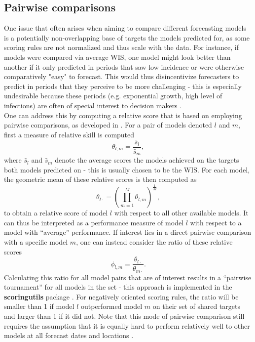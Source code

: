 \subsection{Pairwise comparisons}
One issue that often arises when aiming to compare different forecasting models is a potentially non-overlapping base of targets the models predicted for, as some scoring rules are not normalized and thus scale with the data. For instance, if models were compared via average WIS, one model might look better than another if it only predicted in periods that saw low incidence or were otherwise comparatively "easy" to forecast. This would thus disincentivize forecasters to predict in periods that they perceive to be more challenging - this is especially undesirable because these periods (e.g. exponential growth, high level of infections) are often of special interest to decision makers .\\
One can address this by computing a relative score that is based on employing pairwise comparisons, as developed in \cite{cramer_evaluation_2022}. For a pair of models denoted $l$ and $m$, first a measure of relative skill is computed
\[
\theta_{l,m} = \frac{\bar{s}_{l}}{\bar{s}_{m}},
\]
where $\bar{s}_{l}$ and $\bar{s}_{m}$ denote the average scores the models achieved on the targets both models predicted on - this is usually chosen to be the WIS. For each model, the geometric mean of these relative scores is then computed as
\[
\theta_{l\cdot} = \left(\prod_{m = 1}^{M}\theta_{l,m} \right)^{\frac{1}{M}},
\]to obtain a relative score of model $l$ with respect to all other available models. It can thus be interpreted as a performance measure of model $l$ with respect to a model with ``average'' performance. If interest lies in a direct pairwise comparison with a specific model $m$, one can instead consider the ratio of these relative scores
\[
\phi_{l,m} = \frac{\theta_{l\cdot}}{\theta_{m\cdot}}.
\]
Calculating this ratio for all model pairs that are of interest results in a ``pairwise tournament'' for all models in the set - this approach is implemented in the \textbf{scoringutils} package \citep{bosse_epiforecastsscoringutils_2022}. For negatively oriented scoring rules, the ratio will be smaller than 1 if model $l$ outperformed model $m$ on their set of shared targets and larger than 1 if it did not. Note that this mode of pairwise comparison still requires the assumption that it is equally hard to perform relatively well to other models at all forecast dates and locations \citep{cramer_evaluation_2022}.\\
